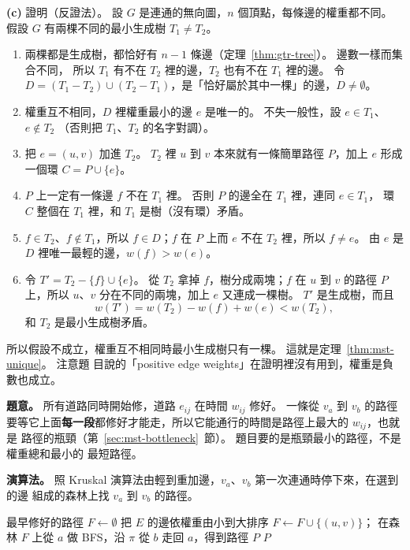 \textbf{(c)} 證明（反證法）。 設 $G$ 是連通的無向圖，$n$ 個頂點，每條邊的權重都不同。 假設 $G$
有兩棵不同的最小生成樹 $T_1 \ne T_2$。

\begin{enumerate}
\item 兩棵都是生成樹，都恰好有 $n - 1$ 條邊（定理~\ref{thm:gtr-tree}）。 邊數一樣而集合不同，
所以 $T_1$ 有不在 $T_2$ 裡的邊，$T_2$ 也有不在 $T_1$ 裡的邊。 令
$D = (T_1 - T_2) \cup (T_2 - T_1)$，是「恰好屬於其中一棵」的邊，$D \ne \emptyset$。
\item 權重互不相同，$D$ 裡權重最小的邊 $e$ 是唯一的。 不失一般性，設 $e \in T_1$、$e \notin T_2$
（否則把 $T_1$、$T_2$ 的名字對調）。
\item 把 $e = (u, v)$ 加進 $T_2$。 $T_2$ 裡 $u$ 到 $v$ 本來就有一條簡單路徑 $P$，加上 $e$ 形成
一個環 $C = P \cup \{e\}$。
\item $P$ 上一定有一條邊 $f$ 不在 $T_1$ 裡。 否則 $P$ 的邊全在 $T_1$ 裡，連同 $e \in T_1$，
環 $C$ 整個在 $T_1$ 裡，和 $T_1$ 是樹（沒有環）矛盾。
\item $f \in T_2$、$f \notin T_1$，所以 $f \in D$；$f$ 在 $P$ 上而 $e$ 不在 $T_2$ 裡，所以
$f \ne e$。 由 $e$ 是 $D$ 裡唯一最輕的邊，$w(f) > w(e)$。
\item 令 $T' = T_2 - \{f\} \cup \{e\}$。 從 $T_2$ 拿掉 $f$，樹分成兩塊；$f$ 在 $u$ 到 $v$ 的路徑
$P$ 上，所以 $u$、$v$ 分在不同的兩塊，加上 $e$ 又連成一棵樹。 $T'$ 是生成樹，而且
\[
w(T') = w(T_2) - w(f) + w(e) < w(T_2),
\]
和 $T_2$ 是最小生成樹矛盾。
\end{enumerate}
所以假設不成立，權重互不相同時最小生成樹只有一棵。 這就是定理~\ref{thm:mst-unique}。 注意題
目說的「positive edge weights」在證明裡沒有用到，權重是負數也成立。

\textbf{題意。} 所有道路同時開始修，道路 $e_{ij}$ 在時間 $w_{ij}$ 修好。 一條從 $v_a$ 到 $v_b$
的路徑要等它上面\textbf{每一段}都修好才能走，所以它能通行的時間是路徑上最大的 $w_{ij}$，也就是
路徑的瓶頸（第~\ref{sec:mst-bottleneck}~節）。 題目要的是瓶頸最小的路徑，不是權重總和最小的
最短路徑。

\textbf{演算法。} 照 Kruskal 演算法由輕到重加邊，$v_a$、$v_b$ 第一次連通時停下來，在選到的邊
組成的森林上找 $v_a$ 到 $v_b$ 的路徑。

\begin{pseudo}[label=alg:mst-px-repair]{最早修好的路徑}
    \State $F \gets \emptyset$
        \State {}
    \EndFor
    \State 把 $E$ 的邊依權重由小到大排序
            \State \Break
        \EndIf
            \State $F \gets F \cup \{(u, v)\}$；
        \EndIf
    \EndFor
    \State 在森林 $F$ 上從 $a$ 做 BFS，沿 $\pi$ 從 $b$ 走回 $a$，得到路徑 $P$
    \State \Return $P$
\EndFunction
\end{pseudo}

